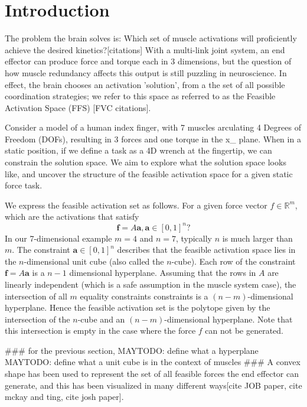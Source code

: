 \section{Introduction}

The problem the brain solves is: Which set of muscle activations will proficiently achieve the desired kinetics?[citations]
With a multi-link joint system, an end effector can produce force and torque each in 3 dimensions, but the question of how muscle redundancy affects this output is still puzzling in neuroscience.
In effect, the brain chooses an activation 'solution', from a the set of all possible coordination strategies; we refer to this space as referred to as the Feasible Activation Space (FFS) [FVC citations].


Consider a model of a human index finger, with 7 muscles arculating 4 Degrees of Freedom (DOFs), resulting in 3 forces and one torque in the x_ plane. When in a static position, if we define a task as a 4D wrench at the fingertip, we can constrain the solution space.
We aim to explore what the solution space looks like, and uncover the structure of the feasible activation space for a given static force task.


We express the feasible activation set as follows. 
For a given force vector $f \in \mathbb{R}^m$, which are the activations that satisfy
\[\textbf{f} = A\textbf{a}, \textbf{a} \in [0,1]^n?\]
In our 7-dimensional example $m =4$ and $n =7$, typically $n$ is much larger than $m$.
The constraint $\textbf{a} \in [0,1]^n$ describes that the feasible activation space lies in the $n$-dimensional unit cube (also called the $n$-cube).
Each row of the constraint $\textbf{f} = A\textbf{a}$ is a $n-1$ dimensional hyperplane.
Assuming that the rows in $A$ are linearly independent (which is a safe assumption in the muscle system case), the intersection of all $m$ equality constraints constraints is a $(n-m)$-dimensional hyperplane.
Hence the feasible activation set is the polytope given by the intersection of the $n$-cube and an $(n-m)$-dimensional hyperplane.
Note that this intersection is empty in the case where the force $f$ can not be generated.


###
for the previous section,
MAYTODO: define what a hyperplane 
MAYTODO: define what a unit cube is in the context of muscles 
###
A convex shape has been used to represent the set of all feasible forces the end effector can generate, and this has been visualized in many different ways[cite JOB paper, cite mckay and ting, cite josh paper].


